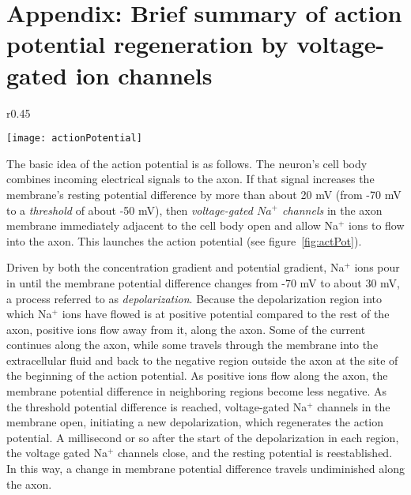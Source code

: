 \newpage

\section*{Appendix: Brief summary of action potential regeneration by voltage-gated ion channels}
\label{lab8appendix}

\begin{wrapfigure}{r}{0.45\textwidth}
  \vspace{-25pt}  
  \begin{center}
  \texttt{[image: actionPotential]}
  \end{center}
  \vspace{-20pt}
  \caption{Voltage schematic of the action potential.}
  \label{fig:actPot}
  \vspace{-10pt}
\end{wrapfigure}

The basic idea of the action potential is as follows.
The neuron's cell body combines incoming electrical signals to the axon. 
If that signal increases the membrane's resting potential difference by more than about 20 mV (from -70 mV to a \emph{threshold} of about -50 mV), then \emph{voltage-gated $Na^{+}$ channels} in the axon membrane immediately adjacent to the cell body open and allow Na$^{+}$ ions to flow into the axon.
This launches the action potential (see figure~\ref{fig:actPot}).
\par
Driven by both the concentration gradient and potential gradient, Na$^{+}$ ions pour in until the membrane potential difference changes from -70 mV to about 30 mV, a process referred to as \emph{depolarization}.
Because the depolarization region into which Na$^{+}$ ions have flowed is at positive potential compared to the rest of the axon, positive ions flow away from it, along the axon.
Some of the current continues along the axon, while some travels through the membrane into the extracellular fluid and back to the negative region outside the axon at the site of the beginning of the action potential.
As positive ions flow along the axon, the membrane potential difference in neighboring regions become less negative.
As the threshold potential difference is reached, voltage-gated Na$^{+}$ channels in the membrane open, initiating a new depolarization, which regenerates the action potential.
A millisecond or so after the start of the depolarization in each region, the voltage gated Na$^{+}$  channels close, and the resting potential is reestablished.
In this way, a change in membrane potential difference travels undiminished along the axon.
